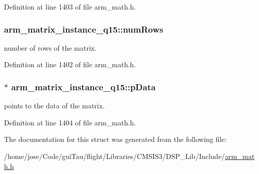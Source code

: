 Definition at line 1403 of file arm\-\_\-math.\-h.

\hypertarget{structarm__matrix__instance__q15_a9bac6ed54be287c4d4f01a1a28be65f5}{
\subsubsection[{num\-Rows}]{ arm\-\_\-matrix\-\_\-instance\-\_\-q15\-::num\-Rows}}\label{structarm__matrix__instance__q15_a9bac6ed54be287c4d4f01a1a28be65f5}
number of rows of the matrix. 

Definition at line 1402 of file arm\-\_\-math.\-h.

\hypertarget{structarm__matrix__instance__q15_a6da33a5553e634787d0f515cf8d724af}{
\subsubsection[{p\-Data}]{$\ast$ arm\-\_\-matrix\-\_\-instance\-\_\-q15\-::p\-Data}}\label{structarm__matrix__instance__q15_a6da33a5553e634787d0f515cf8d724af}
points to the data of the matrix. 

Definition at line 1404 of file arm\-\_\-math.\-h.



The documentation for this struct was generated from the following file\-:\begin{DoxyCompactItemize}
\item 
/home/jose/\-Code/gui\-Tau/flight/\-Libraries/\-C\-M\-S\-I\-S3/\-D\-S\-P\-\_\-\-Lib/\-Include/\hyperlink{arm__math_8h}{arm\-\_\-math.\-h}\end{DoxyCompactItemize}
